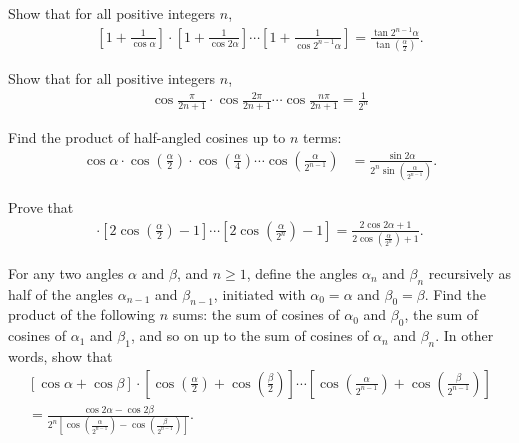 \begin{question}
    Show that for all positive integers $n$,
    \begin{align*}
        \left[1+\frac{1}{\cos \alpha}\right]\cdot \left[1+\frac{1}{\cos 2\alpha}\right] \cdots \left[1+\frac{1}{\cos 2^{n-1}\alpha}\right] = \frac{\tan 2^{n-1}\alpha}{\displaystyle \tan\left(\frac{\alpha}{2}\right)}.
    \end{align*}
\end{question}


\begin{question}
    Show that for all positive integers $n$,
    \begin{align*}
        \cos\frac{\pi}{2n+1} \cdot \cos\frac{2\pi}{2n+1} \cdots \cos\frac{n\pi}{2n+1} = \frac{1}{2^n}
    \end{align*}
\end{question}

\begin{question}
    Find the product of half-angled cosines up to $n$ terms:
    \begin{align*}
        \cos \alpha \cdot \cos\left(\frac{\alpha}{2}\right) \cdot \cos\left(\frac{\alpha}{4}\right) \cdots \cos\left(\frac{\alpha}{2^{n-1}}\right) &= \frac{\sin 2\alpha}{2^n\sin\left(\frac{\alpha}{2^{n-1}}\right)}.
    \end{align*}
\end{question}

\begin{question}
    Prove that
    \begin{align*}
        [2\cos(\alpha) -1 ]\cdot \left[2\cos\left(\frac{\alpha}{2}\right)-1\right] \cdots \left[2\cos\left(\frac{\alpha}{2^n}\right)-1\right] = \frac{2\cos 2\alpha+1}{\displaystyle 2\cos\left(\frac{\alpha}{2^n}\right) + 1}.
    \end{align*}
\end{question}


\begin{question}
    For any two angles $\alpha$ and $\beta$, and $n\geq 1$, define the angles $\alpha_n$ and $\beta_n$ recursively as half of the angles $\alpha_{n-1}$ and $\beta_{n-1}$, initiated with $\alpha_0=\alpha$ and $\beta_0=\beta$. Find the product of the following $n$ sums: the sum of cosines of $\alpha_0$ and $\beta_0$, the sum of cosines of $\alpha_1$ and $\beta_1$, and so on up to the sum of cosines of $\alpha_{n}$ and $\beta_n$. In other words, show that
    \begin{multline*}
        \left[\cos \alpha + \cos \beta\right]\cdot \left[\cos\left(\frac{\alpha}{2}\right)+\cos\left(\frac{\beta}{2}\right)\right]
        \cdots
        \left[\cos\left(\frac{\alpha}{2^{n-1}}\right)+\cos\left(\frac{\beta}{2^{n-1}}\right)\right]
        \\= \frac{\cos 2\alpha - \cos 2\beta}{\displaystyle 2^n\left[\cos\left(\frac{\alpha}{2^{n-1}}\right)-\cos\left(\frac{\beta}{2^{n-1}}\right)\right]}.
    \end{multline*}
\end{question}

